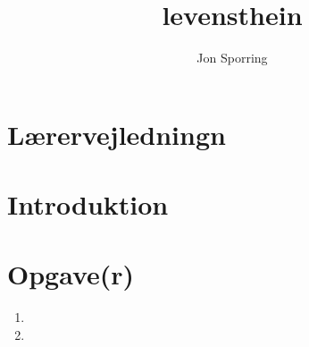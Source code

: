 \documentclass[a4paper,12pt]{article}
\title{levensthein}
\author{Jon Sporring}
\begin{document}
\maketitle

\section{Lærervejledningn}

\section{Introduktion}

\section{Opgave(r)}
\begin{enumerate}
\item 
\item 
\end{enumerate}
\end{document}
